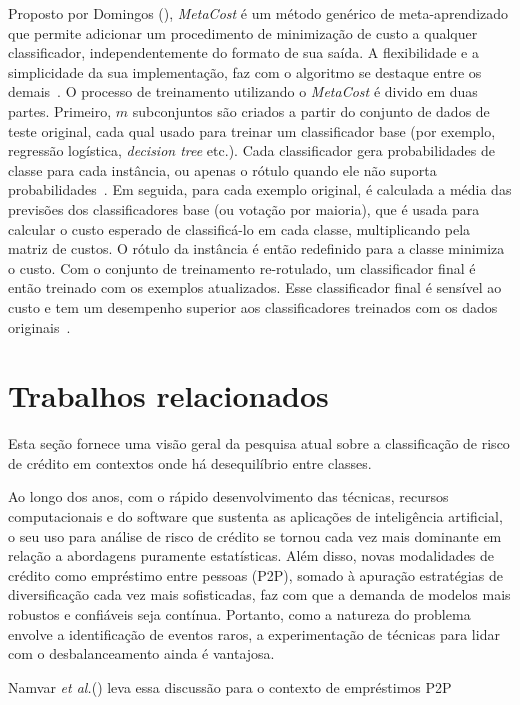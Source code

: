 Proposto por Domingos (\citeyear{Domingos1999}), \textit{MetaCost} é um método genérico de meta-aprendizado que permite adicionar um procedimento de minimização de custo a qualquer classificador, independentemente do formato de sua saída. A flexibilidade e a simplicidade da sua implementação, faz com o algoritmo se destaque entre os demais~\cite[text]{FernndezCs2018, Wang2018}. O processo de treinamento utilizando o \textit{MetaCost} é divido em duas partes. Primeiro, \(m\) subconjuntos são criados a partir do conjunto de dados de teste original, cada qual usado para treinar um classificador base (por exemplo, regressão logística, \textit{decision tree} etc.). Cada classificador gera probabilidades de classe para cada instância, ou apenas o rótulo quando ele não suporta probabilidades~\cite{Araf2024}. Em seguida, para cada exemplo original, é calculada a média das previsões dos classificadores base (ou votação por maioria), que é usada para calcular o custo esperado de classificá-lo em cada classe, multiplicando pela matriz de custos. O rótulo da instância é então redefinido para a classe minimiza o custo. Com o conjunto de treinamento re-rotulado, um classificador final é então treinado com os exemplos atualizados. Esse classificador final é sensível ao custo e tem um desempenho superior aos classificadores treinados com os dados originais~\cite{Chen2021}.

\section{Trabalhos relacionados}

Esta seção fornece uma visão geral da pesquisa atual sobre a classificação de risco de crédito em contextos onde há desequilíbrio entre classes.

Ao longo dos anos, com o rápido desenvolvimento das técnicas, recursos computacionais e do software que sustenta as aplicações de inteligência artificial, o seu uso para análise de risco de crédito se tornou cada vez mais dominante em relação a abordagens puramente estatísticas. Além disso, novas modalidades de crédito como empréstimo entre pessoas (P2P), somado à apuração estratégias de diversificação cada vez mais sofisticadas, faz com que a demanda de modelos mais robustos e confiáveis seja contínua. Portanto, como a natureza do problema envolve a identificação de eventos raros, a experimentação de técnicas para lidar com o desbalanceamento ainda é vantajosa.

Namvar \textit{et al.}(\citeyear{Namvar2018}) leva essa discussão para o contexto de empréstimos P2P 
